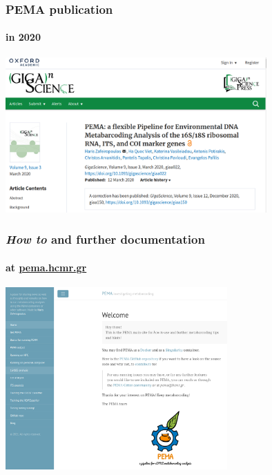 \documentclass{beamer}
\begin{document}
   \begin{frame}
      \frametitle{PEMA publication}
      \framesubtitle{in 2020}
      \includegraphics[width=100mm]{resources/pema_publ.png}
   \end{frame}

   \begin{frame}
      \frametitle{\textit{How to} and further documentation}
      \framesubtitle{at \href{http://pema.hcmr.gr}{pema.hcmr.gr}}
      \includegraphics[width=85mm]{resources/pema_site.png}
   \end{frame}
   \fi 



\end{document}

